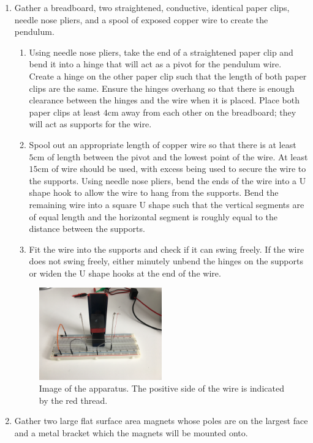 \begin{enumerate}
	\item Gather a breadboard, two straightened, conductive, identical paper clips, needle nose pliers, and a spool of exposed copper wire to create the pendulum.
	\begin{enumerate}
		\item Using needle nose pliers, take the end of a straightened paper clip and bend it into a hinge that will act as a pivot for the pendulum wire.
		Create a hinge on the other paper clip such that the length of both paper clips are the same.
		Ensure the hinges overhang so that there is enough clearance between the hinges and the wire when it is placed.
		Place both paper clips at least $4\si{\centi\meter}$ away from each other on the breadboard; they will act as supports for the wire.
		\item Spool out an appropriate length of copper wire so that there is at least $5\si{\centi\meter}$ of length between the pivot and the lowest point of the wire.
		At least $15\si{\centi\meter}$ of wire should be used, with excess being used to secure the wire to the supports. 
		Using needle nose pliers, bend the ends of the wire into a U shape hook to allow the wire to hang from the supports.
		Bend the remaining wire into a square U shape such that the vertical segments are of equal length and the horizontal segment is roughly equal to the distance between the supports.
		\item Fit the wire into the supports and check if it can swing freely.
		If the wire does not swing freely, either minutely unbend the hinges on the supports or widen the U shape hooks at the end of the wire.
	\end{enumerate}
	\begin{figure}[H]
		\centering
		\includegraphics[width=0.5\textwidth]{figures/IMG_5514.JPG}
		\caption{Image of the apparatus. The positive side of the wire is indicated by the red thread.}
		\label{fig:apparatus}
	\end{figure}
	\item Gather two large flat surface area magnets whose poles are on the largest face and a metal bracket which the magnets will be mounted onto.

\end{enumerate}
